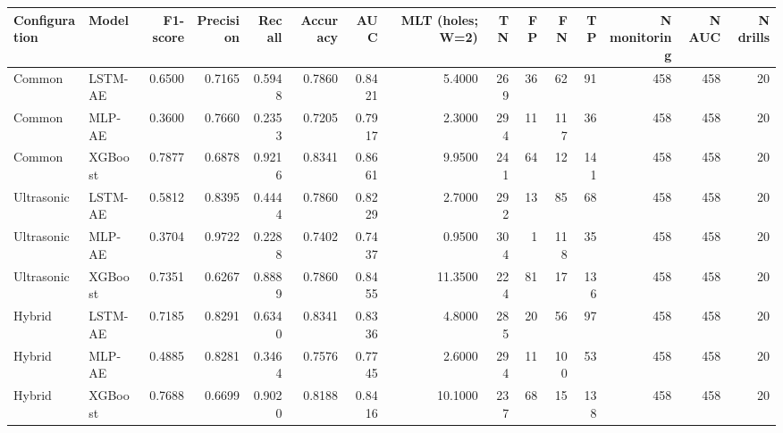 \begin{tabular}{llrrrrrrrrrrrrr}
\toprule
Configuration & Model & F1-score & Precision & Recall & Accuracy & AUC & MLT (holes; W=2) & TN & FP & FN & TP & N monitoring & N AUC & N drills \\
\midrule
Common & LSTM-AE & 0.6500 & 0.7165 & 0.5948 & 0.7860 & 0.8421 & 5.4000 & 269 & 36 & 62 & 91 & 458 & 458 & 20 \\
Common & MLP-AE & 0.3600 & 0.7660 & 0.2353 & 0.7205 & 0.7917 & 2.3000 & 294 & 11 & 117 & 36 & 458 & 458 & 20 \\
Common & XGBoost & 0.7877 & 0.6878 & 0.9216 & 0.8341 & 0.8661 & 9.9500 & 241 & 64 & 12 & 141 & 458 & 458 & 20 \\
Ultrasonic & LSTM-AE & 0.5812 & 0.8395 & 0.4444 & 0.7860 & 0.8229 & 2.7000 & 292 & 13 & 85 & 68 & 458 & 458 & 20 \\
Ultrasonic & MLP-AE & 0.3704 & 0.9722 & 0.2288 & 0.7402 & 0.7437 & 0.9500 & 304 & 1 & 118 & 35 & 458 & 458 & 20 \\
Ultrasonic & XGBoost & 0.7351 & 0.6267 & 0.8889 & 0.7860 & 0.8455 & 11.3500 & 224 & 81 & 17 & 136 & 458 & 458 & 20 \\
Hybrid & LSTM-AE & 0.7185 & 0.8291 & 0.6340 & 0.8341 & 0.8336 & 4.8000 & 285 & 20 & 56 & 97 & 458 & 458 & 20 \\
Hybrid & MLP-AE & 0.4885 & 0.8281 & 0.3464 & 0.7576 & 0.7745 & 2.6000 & 294 & 11 & 100 & 53 & 458 & 458 & 20 \\
Hybrid & XGBoost & 0.7688 & 0.6699 & 0.9020 & 0.8188 & 0.8416 & 10.1000 & 237 & 68 & 15 & 138 & 458 & 458 & 20 \\
\bottomrule
\end{tabular}
